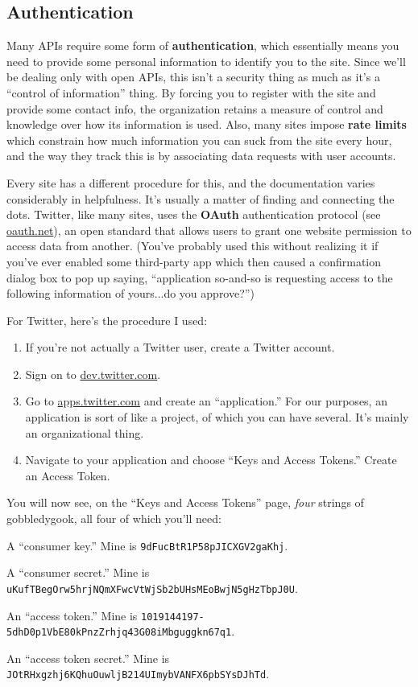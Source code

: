 \documentclass[12pt]{article}
\begin{document}
\subsection{Authentication}

Many APIs require some form of \textbf{authentication}, which essentially
means you need to provide some personal information to identify you to the
site. Since we'll be dealing only with open APIs, this isn't a security thing
as much as it's a ``control of information'' thing. By forcing you to register
with the site and provide some contact info, the organization retains a
measure of control and knowledge over how its information is used. Also, many
sites impose \textbf{rate limits} which constrain how much information you can
suck from the site every hour, and the way they track this is by associating
data requests with user accounts.

Every site has a different procedure for this, and the documentation varies
considerably in helpfulness. It's usually a matter of finding and connecting
the dots. Twitter, like many sites, uses the \textbf{OAuth} authentication
protocol (see \url{oauth.net}), an open standard that allows users to grant
one website permission to access data from another. (You've probably used this
without realizing it if you've ever enabled some third-party app which then
caused a confirmation dialog box to pop up saying, ``application so-and-so is
requesting access to the following information of yours...do you approve?'')

For Twitter, here's the procedure I used:

\begin{enumerate}
\itemsep.1em
\item If you're not actually a Twitter user, create a Twitter account.
\item Sign on to \url{dev.twitter.com}.
\item Go to \url{apps.twitter.com} and create an ``application.'' For our
purposes, an application is sort of like a project, of which you can have
several. It's mainly an organizational thing.
\item Navigate to your application and choose ``Keys and Access Tokens.''
Create an Access Token.
\end{enumerate}

You will now see, on the ``Keys and Access Tokens'' page, \textit{four} strings
of gobbledygook, all four of which you'll need:

\vspace{.1in}
\small
\begin{compactitem}
\item A ``consumer key.'' Mine is \texttt{9dFucBtR1P58pJICXGV2gaKhj}.
\item A ``consumer secret.'' Mine is
\texttt{uKufTBegOrw5hrjNQmXFwcVtWjSb2bUHsMEoBwjN5gHzTbpJ0U}.
\item An ``access token.'' Mine is
\texttt{1019144197-5dhD0p1VbE80kPnzZrhjq43G08iMbguggkn67q1}.
\item An ``access token secret.'' Mine is
\texttt{JOtRHxgzhj6KQhuOuwljB214UImybVANFX6pbSYsDJhTd}.
\end{compactitem}
\normalsize
\vspace{.1in}
\end{document}
